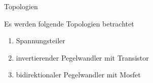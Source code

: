 
\begin{frame}[c]{Topologien} 

  Es werden folgende Topologien betrachtet
  \begin{enumerate}
    \item Spannungsteiler
    \item invertierender Pegelwandler mit Transistor
    \item bidirektionaler Pegelwandler mit Mosfet
  \end{enumerate}

\end{frame}
